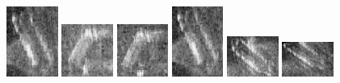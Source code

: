 \begin{figure}
    \includegraphics[width=0.15\textwidth]{chapters/images/dataset/all-class-images/bottle/bottle-399.jpg}
    \includegraphics[width=0.15\textwidth]{chapters/images/dataset/all-class-images/bottle/bottle-25.jpg}
    \includegraphics[width=0.15\textwidth]{chapters/images/dataset/all-class-images/bottle/bottle-10.jpg}
    \includegraphics[width=0.15\textwidth]{chapters/images/dataset/all-class-images/bottle/bottle-403.jpg}
    \includegraphics[width=0.15\textwidth]{chapters/images/dataset/all-class-images/bottle/bottle-81.jpg}
    \includegraphics[width=0.15\textwidth]{chapters/images/dataset/all-class-images/bottle/bottle-121.jpg}
    

\end{figure}
